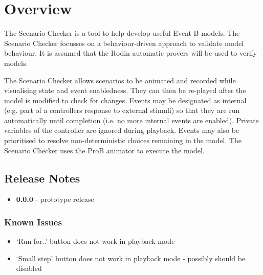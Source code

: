 \section{Overview}
\label{sec:overview}

The Scenario Checker is a tool to help develop useful Event-B models.
The Scenario Checker focusses on a behaviour-driven approach to validate model behaviour.
It is assumed that the Rodin automatic provers will be used to verify models.

The Scenario Checker allows scenarios to be animated and recorded while visualising state and event enabledness.
They can then be re-played after the model is modified to check for changes.
Events may be designated as internal (e.g. part of a controllers response to external stimuli) so that they are run automatically until completion (i.e. no more internal events are enabled). 
Private variables of the controller are ignored during playback.
Events may also be prioritised to resolve non-deterministic choices remaining in the model.
The Scenario Checker uses the ProB animator to execute the model.

\subsection{Release Notes}
\label{sec:release-notes}

\begin{itemize}
	\item \textbf{0.0.0} - prototype release
\end{itemize}

\subsubsection{Known Issues}
\label{sec:known-issues}

\begin{itemize}
	\item `Run for..' button does not work in playback mode
	\item `Small step' button does not work in playback mode - possibly should be disabled
\end{itemize}


